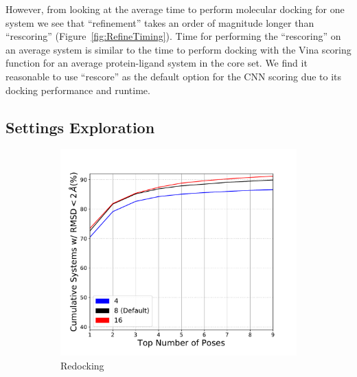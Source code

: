 \documentclass[journal=jcisd8,manuscript=article]{achemso}
\begin{document}
However, from looking at the average time to perform molecular docking for one system we see that ``refinement'' takes an order of magnitude longer than ``rescoring'' (Figure~\ref{fig:RefineTiming}). Time for performing the ``rescoring'' on an average system is similar to the time to perform docking with the Vina scoring function for an average protein-ligand system in the core set. We find it reasonable to use ``rescore'' as the default option for the CNN scoring due to its docking performance and runtime.

\subsection{Settings Exploration}

\begin{figure}    
        \begin{subfigure}[b]{0.48\textwidth}    
		\centering
		\includegraphics[width=\textwidth]{figures/redocking/sweep_exhaustiveness_line.pdf}
		\caption{Redocking}
		\label{fig:exhaustiveness rd}
        \end{subfigure}    
        \begin{subfigure}[b]{0.48\textwidth}    
		\centering

\end{subfigure}
\end{figure}
\end{document}
